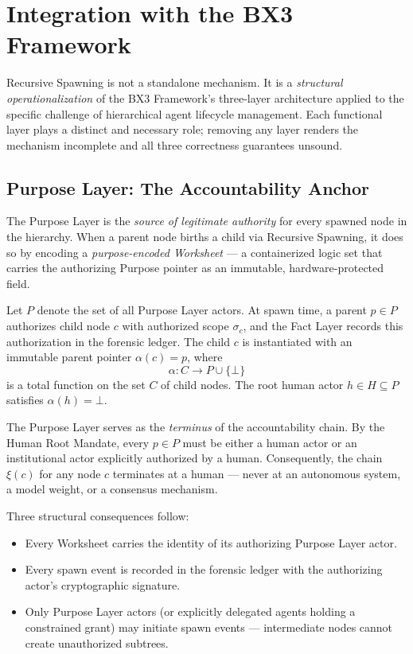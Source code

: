 \section{Integration with the BX3 Framework}
\label{sec:bx3-integration}

Recursive Spawning is not a standalone mechanism. It is a \textit{structural operationalization} of the BX3 Framework's three-layer architecture applied to the specific challenge of hierarchical agent lifecycle management. Each functional layer plays a distinct and necessary role; removing any layer renders the mechanism incomplete and all three correctness guarantees unsound.

\subsection{Purpose Layer: The Accountability Anchor}
\label{sec:purpose-anchor}

The Purpose Layer is the \textit{source of legitimate authority} for every spawned node in the hierarchy. When a parent node births a child via Recursive Spawning, it does so by encoding a \textit{purpose-encoded Worksheet} — a containerized logic set that carries the authorizing Purpose pointer as an immutable, hardware-protected field.

Let $P$ denote the set of all Purpose Layer actors. At spawn time, a parent $p \in P$ authorizes child node $c$ with authorized scope $\sigma_c$, and the Fact Layer records this authorization in the forensic ledger. The child $c$ is instantiated with an immutable parent pointer $\alpha(c) = p$, where
\begin{equation}
\alpha : C \rightarrow P \cup \{\bot\}
\tag{1}
\end{equation}
is a total function on the set $C$ of child nodes. The root human actor $h \in H \subseteq P$ satisfies $\alpha(h) = \bot$.

The Purpose Layer serves as the \textit{terminus} of the accountability chain. By the Human Root Mandate, every $p \in P$ must be either a human actor or an institutional actor explicitly authorized by a human. Consequently, the chain $\xi(c)$ for any node $c$ terminates at a human — never at an autonomous system, a model weight, or a consensus mechanism.

Three structural consequences follow:

\begin{itemize}
    \itemsep0em
    \item Every Worksheet carries the identity of its authorizing Purpose Layer actor.
    \item Every spawn event is recorded in the forensic ledger with the authorizing actor's cryptographic signature.
    \item Only Purpose Layer actors (or explicitly delegated agents holding a constrained grant) may initiate spawn events — intermediate nodes cannot create unauthorized subtrees.
\end{itemize}


